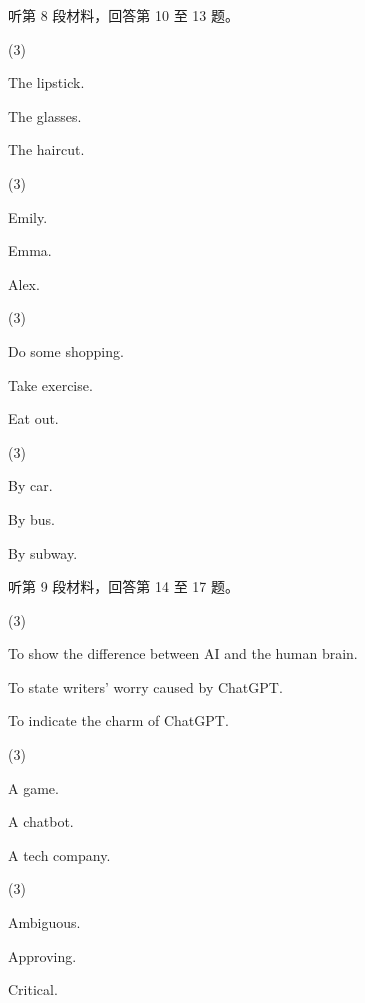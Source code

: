 \documentclass{英语试卷}
\begin{document}
\par 听第 8 段材料，回答第 10 至 13 题。\par
{}
\begin{choices}(3)
  \item The lipstick.
  \item The glasses.
  \item The haircut.
\end{choices}
\begin{choices}(3)
  \item Emily.
  \item Emma.
  \item Alex.
\end{choices}
\begin{choices}(3)
  \item Do some shopping.
  \item Take exercise.
  \item Eat out.
\end{choices}
\begin{choices}(3)
  \item By car.
  \item By bus.
  \item By subway.
\end{choices}
\par 听第 9 段材料，回答第 14 至 17 题。\par
{}
\begin{choices}(3)
  \item To show the difference between AI and the human brain.
  \item To state writers' worry caused by ChatGPT.
  \item To indicate the charm of ChatGPT.
\end{choices}
\begin{choices}(3)
  \item A game.
  \item A chatbot.
  \item A tech company.
\end{choices}
\begin{choices}(3)
  \item Ambiguous.
  \item Approving.
  \item Critical.
\end{choices}
\end{document}
